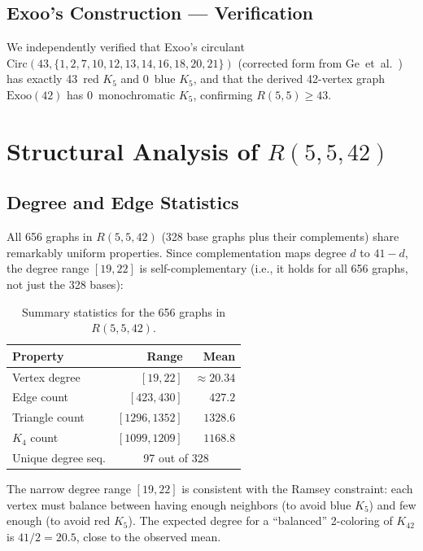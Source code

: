 \documentclass[11pt,a4paper]{article}
\theoremstyle{definition}
\theoremstyle{remark}
\newcommand{\Kn}[1]{K_{#1}}
\newcommand{\Rset}[3]{R(#1,#2,#3)}
\begin{document}
\subsection{Exoo's Construction --- Verification}

We independently verified that Exoo's circulant
$\mathrm{Circ}(43, \{1,2,7,10,12,13,14,16,18,20,21\})$
(corrected form from Ge~et~al.~\cite{GeEtAl2022})
has exactly 43~red $K_5$ and 0~blue $K_5$, and that the
derived 42-vertex graph $\mathrm{Exoo}(42)$ has
0~monochromatic $K_5$, confirming $R(5,5) \geq 43$.

\section{Structural Analysis of $\Rset{5}{5}{42}$}
\label{sec:structural}

\subsection{Degree and Edge Statistics}

All 656 graphs in $\Rset{5}{5}{42}$ (328 base graphs plus their
complements) share remarkably uniform properties.
Since complementation maps degree $d$ to $41 - d$, the degree
range $[19, 22]$ is self-complementary (i.e., it holds for
all 656 graphs, not just the 328 bases):

\begin{table}[h]
\centering
\begin{tabular}{lrr}
\toprule
\textbf{Property} & \textbf{Range} & \textbf{Mean} \\
\midrule
Vertex degree       & $[19, 22]$      & $\approx 20.34$ \\
Edge count          & $[423, 430]$    & $427.2$ \\
Triangle count      & $[1296, 1352]$  & $1328.6$ \\
$K_4$ count         & $[1099, 1209]$  & $1168.8$ \\
Unique degree seq.  & \multicolumn{2}{c}{97 out of 328} \\
\bottomrule
\end{tabular}
\caption{Summary statistics for the 656 graphs in $\Rset{5}{5}{42}$.}
\label{tab:degree}
\end{table}

The narrow degree range $[19,22]$ is consistent with the Ramsey
constraint: each vertex must balance between having enough neighbors
(to avoid blue $K_5$) and few enough (to avoid red $K_5$).
The expected degree for a ``balanced'' 2-coloring of $\Kn{42}$ is
$41/2 = 20.5$, close to the observed mean.
\end{document}
